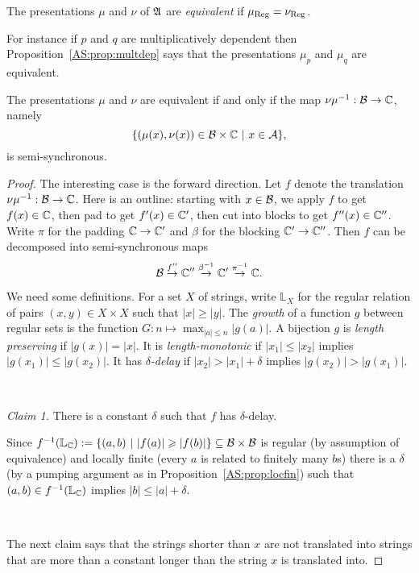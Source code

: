 \begin{definition} \cite{Bara06}
The presentations  $\mu$ and $\nu$ of $\mathfrak{A}$ are {\em equivalent} if $\mu_{\operatorname{Reg}}  = \nu_{\operatorname{Reg}}$.
\end{definition}

For instance if $p$ and $q$ are multiplicatively dependent then Proposition~\ref{AS:prop:multdep} says that the presentations $\mu_p$ and $\mu_q$ are equivalent.

\begin{theorem} \cite{Bara06}
The presentations $\mu$ and $\nu$ are equivalent if and only if the map $\nu \mu^{-1}:{\mathcal B} \to \mathbb{C}$, namely
 \[
  \{(\mu(x), \nu(x)) \in {\mathcal B} \times \mathbb{C}\ \vert \  x \in {\mathcal A}\},
 \]
is semi-synchronous.
\end{theorem}

\begin{proof}
The interesting case is the forward direction. Let $f$ denote the translation $\nu\mu^{-1}:{\mathcal B} \to \mathbb{C}$. 
Here is an outline: starting with $x \in {\mathcal B}$, we apply $f$ to get $f(x) \in \mathbb{C}$, then pad to get $f'(x) \in \mathbb{C}'$,
then cut into blocks to get $f''(x) \in \mathbb{C}''$. 
Write $\pi$ for the padding $\mathbb{C} \to \mathbb{C}'$ and $\beta$ for the blocking $\mathbb{C}' \to \mathbb{C}''$.
Then $f$ can be decomposed into semi-synchronous maps
\[
 {\mathcal B} \stackrel{f''}{\to} \mathbb{C}'' \stackrel{\beta^{-1}}{\to} \mathbb{C}' \stackrel{\pi^{-1}}{\to} \mathbb{C}.
\]

We need some definitions. 
For a set $X$ of strings, write $\mathbb{L}_X$ for the regular relation of pairs $(x,y) \in X \times X$ such that $|x| \geq |y|$. 
The {\em growth} of a function $g$ between regular sets is the function 
$G:n \mapsto \max_{|a| \leq n} |g(a)|$. A bijection $g$ is {\em length preserving} if $|g(x)| = |x|$.
It is {\em length-monotonic} if $|x_1| \leq |x_2|$ implies $|g(x_1)| \leq |g(x_2)|$. It has {\em $\delta$-delay} 
if $|x_2| > |x_1| + \delta$ implies $|g(x_2)| > |g(x_1)|$.


\

\noindent
{\em Claim 1.} There is a constant $\delta$ such that $f$ has $\delta$-delay.

Since $f^{-1}(\mathbb{L}_{\mathbb{C}}) := \{(a,b) \ \vert \  |f(a)| \geqslant |f(b)|\} \subseteq {\mathcal B} \times {\mathcal B}$ is regular (by assumption of equivalence) and locally finite (every $a$ is related to finitely many $b$s) 
there is a $\delta$ (by a pumping argument as in Proposition~\ref{AS:prop:locfin}) such that $(a,b) \in f^{-1}(\mathbb{L}_{\mathbb{C}})$ implies $|b| \leq |a| + \delta$.

\

The next claim says that the strings shorter than $x$ are not translated into strings that are more than a constant longer than the string $x$ is translated into.


\end{proof}
